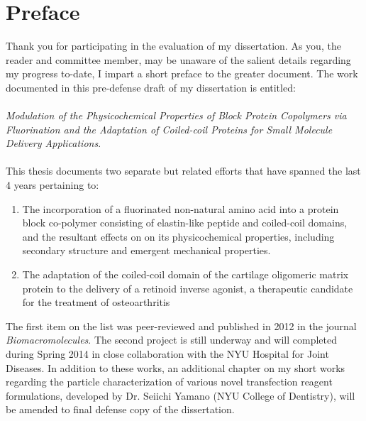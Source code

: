\section*{Preface}

Thank you for participating in the evaluation of my dissertation. As you, the
reader and committee member, may be unaware of the salient details regarding my
progress to-date, I impart a short preface to the greater document.  The work
documented in this pre-defense draft of my dissertation is entitled:
\hspace{0pt}\\
\hspace{0pt}\\
\emph{Modulation of the Physicochemical Properties of Block Protein Copolymers
via Fluorination and the Adaptation of Coiled-coil Proteins for Small Molecule
Delivery Applications}.
\hspace{0pt}\\
\hspace{0pt}\\
This thesis documents two separate but related efforts that have spanned the
last 4 years pertaining to:
   
\begin{enumerate}

    \item The incorporation of a fluorinated non-natural amino acid into a
        protein block co-polymer consisting of elastin-like peptide and
        coiled-coil domains, and the resultant effects on on its physicochemical
        properties, including secondary structure and emergent mechanical
        properties.

    \item The adaptation of the coiled-coil domain of the cartilage oligomeric
        matrix protein to the delivery of a retinoid inverse agonist, a
        therapeutic candidate for the treatment of osteoarthritis

\end{enumerate}
The first item on the list was peer-reviewed and published in 2012 in the
journal \emph{Biomacromolecules}. The second project is still underway and will
completed during Spring 2014 in close collaboration with the NYU Hospital for
Joint Diseases. In addition to these works, an additional chapter on my short
works regarding the particle characterization of various novel transfection
reagent formulations, developed by Dr. Seiichi Yamano (NYU College of
Dentistry), will be amended to final defense copy of the dissertation.
